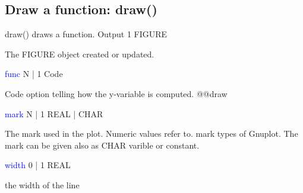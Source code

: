\subsection{Draw a function: \textcolor{VioletRed}{draw}()}
\label{draw}
\textcolor{VioletRed}{draw}() draws a function.
\vspace{0.3cm}
\hline
\vspace{0.3cm}
\noindent Output  \tabto{3cm}  1 \tabto{5cm}   FIGURE  \tabto{7cm}
\begin{changemargin}{3cm}{0cm}
\noindent  The FIGURE object created or updated.
\end{changemargin}
\vspace{0.3cm}
\hline
\vspace{0.3cm}
\noindent \textcolor{blue}{func} \tabto{3cm}  N | 1  \tabto{5cm}   Code  \tabto{7cm}
\begin{changemargin}{3cm}{0cm}
\noindent   Code option telling how the y-variable is computed.
@@draw
\end{changemargin}
\vspace{0.3cm}
\hline
\vspace{0.3cm}
\noindent \textcolor{blue}{mark}  \tabto{3cm}  N | 1  \tabto{5cm}   REAL | CHAR  \tabto{7cm}
\begin{changemargin}{3cm}{0cm}
\noindent  The mark used in the plot.
Numeric values refer to.
mark types of Gnuplot. The mark can be given also as CHAR varible or constant.
\end{changemargin}
\vspace{0.3cm}
\hline
\vspace{0.3cm}
\noindent \textcolor{blue}{width}  \tabto{3cm}  0 | 1  \tabto{5cm}   REAL  \tabto{7cm}
\begin{changemargin}{3cm}{0cm}
\noindent  the width of the line
\end {changemargin}
\hline
\vspace{0.2cm}
